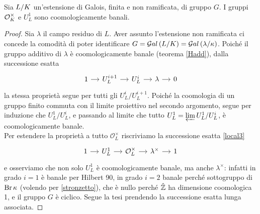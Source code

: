 \begin{theorem}
	Sia $ L/K $ un'estensione di Galois, finita e non ramificata, di gruppo $ G $. I gruppi $ \mathcal{O}_{K}^\times $ e $ U_L^1 $ sono coomologicamente banali.
\end{theorem}
\begin{proof}
	Sia $ \lambda $ il campo residuo di $ L $. Aver assunto l'estensione non ramificata ci concede la comodità di poter identificare $ G = \mathcal{G}al\left( L/K \right) = \mathcal{G}al\left( \lambda / \kappa \right) $. Poiché il gruppo additivo di $ \lambda $ è coomologicamente banale (teorema \ref{Hadd}), dalla successione esatta
	\[\begin{tikzcd}[column sep = small]
	1 \rar
	& U_L^{i+1} \rar
	& U_{L}^i \rar
	& \lambda \rar
	& 0
	\end{tikzcd}\]
	la stessa proprietà segue per tutti gli $ U^i_{L} / U^{i+1}_{L} $.
	Poiché la coomologia di un gruppo finito commuta con il limite proiettivo nel secondo argomento, segue per induzione che $ U^1_{L} / U^{i}_{L} $, e passando al limite che tutto $ U^1_L = \varprojlim U^1_{L} / U^{i}_{L} $, è coomologicamente banale. \\
	
	Per estendere la proprietà a tutto $ \mathcal{O}_{L}^\times $ riscriviamo la successione esatta \ref{local3}
	\begin{equation*}
	\begin{tikzcd}[column sep = small]
	1 \rar
	& U_L^{1} \rar
	& \mathcal{O}_{L}^\times \rar
	& \lambda^\times \rar
	&1
	\end{tikzcd}
	\end{equation*}
	e osserviamo che non solo $  U^1_L $ è coomologicamente banale, ma anche $ \lambda^\times $: infatti in grado $ i = 1 $ è banale per Hilbert 90, in grado $ i = 2 $ banale perché sottogruppo di $ \operatorname{Br} \kappa $ (volendo per \ref{stronzetto}), che è nullo perché $ \hat{\mathbb{Z}} $ ha dimensione coomologica 1, e il gruppo $ G $ è ciclico. Segue la tesi prendendo la successione esatta lunga associata.
\end{proof}


